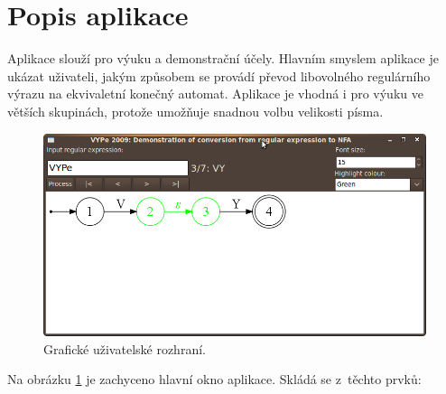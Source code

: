 \documentclass[10pt, notitlepage]{article}
\begin{document}
\section{Popis aplikace}
\label{sec:AppDesc}

Aplikace slouží pro výuku a demonstrační účely. Hlavním smyslem aplikace je
ukázat uživateli, jakým způsobem se provádí převod libovolného regulárního
výrazu na ekvivaletní konečný automat. Aplikace je vhodná i pro výuku ve
větších skupinách, protože umožňuje snadnou volbu velikosti písma.

\begin{figure}[h]
	\begin{center}
		\includegraphics[width=\textwidth,keepaspectratio]{include/gui}
	\end{center}
	\caption{Grafické uživatelské rozhraní.}
	\label{fig:GUI}
\end{figure}

Na obrázku \ref{fig:GUI} je zachyceno hlavní okno aplikace. Skládá se z~těchto
prvků:
\end{document}
